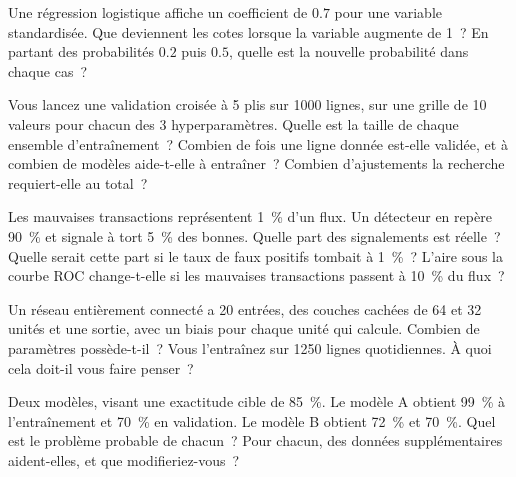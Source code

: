 \begin{question}\label{iq:iv1:machine-learning:5}
Une régression logistique affiche un coefficient de $0.7$ pour une variable standardisée. Que deviennent les cotes lorsque la variable augmente de 1~? En partant des probabilités $0.2$ puis $0.5$, quelle est la nouvelle probabilité dans chaque cas~?
\end{question}

\begin{question}\label{iq:iv1:machine-learning:6}
Vous lancez une validation croisée à 5 plis sur 1000 lignes, sur une grille de 10 valeurs pour chacun des 3 hyperparamètres. Quelle est la taille de chaque ensemble d'entraînement~? Combien de fois une ligne donnée est-elle validée, et à combien de modèles aide-t-elle à entraîner~? Combien d'ajustements la recherche requiert-elle au total~?
\end{question}

\begin{question}\label{iq:iv1:machine-learning:7}
Les mauvaises transactions représentent 1~\% d'un flux. Un détecteur en repère 90~\% et signale à tort 5~\% des bonnes. Quelle part des signalements est réelle~? Quelle serait cette part si le taux de faux positifs tombait à 1~\%~? L'aire sous la courbe ROC change-t-elle si les mauvaises transactions passent à 10~\% du flux~?
\end{question}

\begin{question}\label{iq:iv1:machine-learning:8}
Un réseau entièrement connecté a 20 entrées, des couches cachées de 64 et 32 unités et une sortie, avec un biais pour chaque unité qui calcule. Combien de paramètres possède-t-il~? Vous l'entraînez sur 1250 lignes quotidiennes. À quoi cela doit-il vous faire penser~?
\end{question}

\begin{question}\label{iq:iv1:machine-learning:9}
Deux modèles, visant une exactitude cible de 85~\%. Le modèle A obtient 99~\% à l'entraînement et 70~\% en validation. Le modèle B obtient 72~\% et 70~\%. Quel est le problème probable de chacun~? Pour chacun, des données supplémentaires aident-elles, et que modifieriez-vous~?
\end{question}

